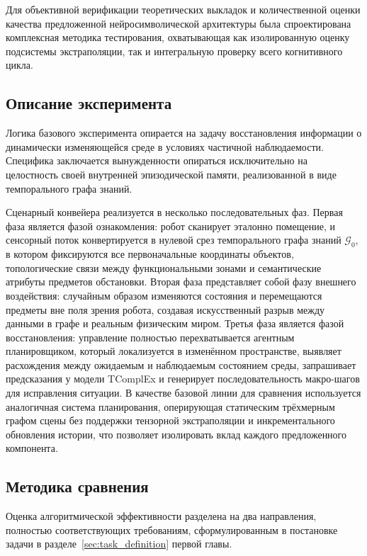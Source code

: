 Для объективной верификации теоретических выкладок и количественной оценки качества предложенной нейросимволической архитектуры была спроектирована комплексная методика тестирования, охватывающая как изолированную оценку подсистемы экстраполяции, так и интегральную проверку всего когнитивного цикла.

\subsection{Описание эксперимента}

Логика базового эксперимента опирается на задачу восстановления информации о динамически изменяющейся среде в условиях частичной наблюдаемости. Специфика заключается вынужденности опираться исключительно на целостность своей внутренней эпизодической памяти, реализованной в виде темпорального графа знаний.

Сценарный конвейера реализуется в несколько последовательных фаз. Первая фаза является фазой ознакомления: робот сканирует эталонно помещение, и сенсорный поток конвертируется в нулевой срез темпорального графа знаний $\displaystyle \mathcal{G}_0$, в котором фиксируются все первоначальные координаты объектов, топологические связи между функциональными зонами и семантические атрибуты предметов обстановки. Вторая фаза представляет собой фазу внешнего воздействия: случайным образом изменяются состояния и перемещаются предметы вне поля зрения робота, создавая искусственный разрыв между данными в графе и реальным физическим миром. Третья фаза является фазой восстановления: управление полностью перехватывается агентным планировщиком, который локализуется в изменённом пространстве, выявляет расхождения между ожидаемым и наблюдаемым состоянием среды, запрашивает предсказания у модели TComplEx и генерирует последовательность макро-шагов для исправления ситуации. В качестве базовой линии для сравнения используется аналогичная система планирования, оперирующая статическим трёхмерным графом сцены без поддержки тензорной экстраполяции и инкрементального обновления истории, что позволяет изолировать вклад каждого предложенного компонента.

\subsection{Методика сравнения}

Оценка алгоритмической эффективности разделена на два направления, полностью соответствующих требованиям, сформулированным в постановке задачи в разделе~\ref{sec:task_definition} первой главы.

